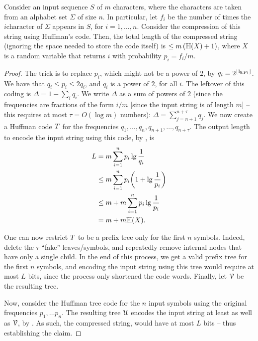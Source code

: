 \begin{theorem}
    Consider an input sequence $S$ of $m$ characters, where the
    characters are taken from an alphabet set $\Sigma$ of size $n$. In
    particular, let $f_i$ be the number of times the $i$\th character
    of $\Sigma$ appears in $S$, for $i=1,\ldots, n$. Consider the
    compression of this string using Huffman's code. Then, the total
    length of the compressed string (ignoring the space needed to
    store the code itself) is $\leq m \,(\Entropy{X} + 1)$, where $X$
    is a random variable that returns $i$ with probability
    $p_i = f_i/m$.
\end{theorem}
\begin{proof}
    The trick is to replace $p_i$, which might not be a power of $2$,
    by $q_i = 2^{\left\lfloor {\lg p_i } \right\rfloor}$. We have that
    $q_i \leq p_i \leq 2q_i$, and $q_i$ is a power of $2$, for all
    $i$. The leftover of this coding is $\Delta = 1 - \sum_i q_i$. We
    write $\Delta$ as a sum of powers of $2$ (since the frequencies
    are fractions of the form $i/m$ [since the input string is of
    length $m$] -- this requires at most $\tau = O(\log m)$ numbers):
    $\Delta = \sum_{j=n+1}^{n+\tau}q_j$. We now create a Huffman code
    $T$ for the frequencies
    ${q_1, \ldots, q_n, q_{n+1}, \ldots, q_{n+\tau}}$. The output
    length to encode the input string using this code, by
    , is
    \begin{align*}
        L%
        &=%
        m \sum_{i=1}^n p_i \lg \frac{1}{q_i}
        \\&\leq %
        m \sum_{i=1}^n p_i \pth{ 1 + \lg \frac{1}{p_i}}
        \\&\leq %
        m + m \sum_{i=1}^n p_i  \lg \frac{1}{p_i}%
        \\&=%
        m + m \EntropyX{X}.
    \end{align*}

    One can now restrict $T$ to be a prefix tree only for the
    first $n$ symbols. Indeed, delete the $\tau$ ``fake''
    leaves/symbols, and repeatedly remove internal nodes that have only
    a single child. In the end of this process, we get a valid prefix
    tree for the first $n$ symbols, and encoding the input string
    using this tree would require at most $L$ bits, since the process only
    shortened the code words. Finally, let $\EuScript{V}$ be the resulting
    tree.

    Now, consider the Huffman tree code for the $n$ input symbols
    using the original frequencies $p_1,\ldots p_n$. The resulting
    tree $\EuScript{U}$ encodes the input string at least as well as
    $\EuScript{V}$, by . As such, the compressed
    string, would have at most $L$ bits -- thus establishing the
    claim.
\end{proof}




